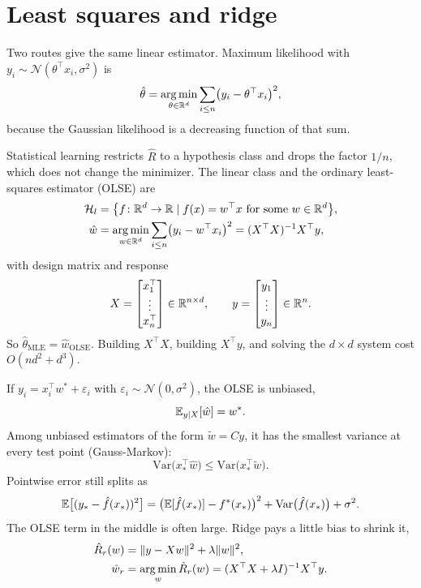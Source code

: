 \section{Least squares and ridge}
\label{sec:ls}

Two routes give the same linear estimator.
Maximum likelihood with \(y_i\sim\mathcal{N}(\theta^\top x_i,\sigma^2)\) is
\begin{equation}
\hat\theta
= \operatorname*{arg\,min}_{\theta\in\mathbb{R}^d}\sum_{i\le n}\bigl(y_i-\theta^\top x_i\bigr)^2,
\label{eq:mle}
\end{equation}
because the Gaussian likelihood is a decreasing function of that sum.

Statistical learning restricts \(\hat R\) to a hypothesis class and drops the factor \(1/n\), which does not change the minimizer.
The linear class and the ordinary least-squares estimator (OLSE) are
\begin{align}
\mathcal{H}_l
&= \bigl\{f\colon\mathbb{R}^d\to\mathbb{R} \mid f(x)=w^\top x \text{ for some } w\in\mathbb{R}^d\bigr\},
\label{eq:Hl}\\
\hat w
&= \operatorname*{arg\,min}_{w\in\mathbb{R}^d}\sum_{i\le n}\bigl(y_i-w^\top x_i\bigr)^2
= (X^\top X)^{-1}X^\top y,
\label{eq:olse}
\end{align}
with design matrix and response
\begin{equation}
X =
\begin{bmatrix}
x_1^\top \\ \vdots \\ x_n^\top
\end{bmatrix}
\in\mathbb{R}^{n\times d},
\qquad
y =
\begin{bmatrix}
y_1 \\ \vdots \\ y_n
\end{bmatrix}
\in\mathbb{R}^n.
\label{eq:design}
\end{equation}
So \(\hat\theta_{\mathrm{MLE}}=\hat w_{\mathrm{OLSE}}\).
Building \(X^\top X\), building \(X^\top y\), and solving the \(d\times d\) system cost
\(O(nd^2+d^3)\).

If \(y_i=x_i^\top w^*+\varepsilon_i\) with \(\varepsilon_i\sim\mathcal{N}(0,\sigma^2)\), the OLSE is unbiased,
\begin{equation}
\mathbb{E}_{y\mid X}[\hat w] = w^*.
\label{eq:unbiased}
\end{equation}
Among unbiased estimators of the form \(\tilde w=Cy\), it has the smallest variance at every test point (Gauss-Markov):
\begin{equation}
\mathrm{Var}\bigl(x_*^\top\hat w\bigr)
\le \mathrm{Var}\bigl(x_*^\top\tilde w\bigr).
\label{eq:gm}
\end{equation}
Pointwise error still splits as
\begin{equation}
\mathbb{E}\bigl[(y_*-\hat f(x_*))^2\bigr]
= \bigl(\mathbb{E}[\hat f(x_*)]-f^*(x_*)\bigr)^2
+ \mathrm{Var}\bigl(\hat f(x_*)\bigr)
+ \sigma^2.
\label{eq:bv}
\end{equation}
The OLSE term in the middle is often large.
Ridge pays a little bias to shrink it,
\begin{align}
\hat R_r(w)
&= \lVert y-Xw\rVert^2 + \lambda\lVert w\rVert^2,
\label{eq:ridge-obj}\\
\hat w_r
&= \operatorname*{arg\,min}_w \hat R_r(w)
= (X^\top X+\lambda I)^{-1}X^\top y.
\label{eq:ridge}
\end{align}
